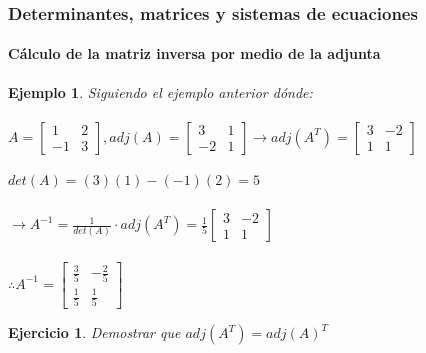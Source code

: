 \documentclass[11pt]{beamer}
\newtheorem{eje}{Ejercicio}
\newtheorem{ejem}{Ejemplo}
\begin{document}
\begin{frame}
\frametitle{Determinantes, matrices y sistemas de ecuaciones}
\framesubtitle{Cálculo de la matriz inversa por medio de la adjunta}
\begin{ejem}
Siguiendo el ejemplo anterior dónde: \\ \hspace{0cm} \\
${\displaystyle A = {\begin{bmatrix}1&2\\-1&3\end{bmatrix}}}, 
{\displaystyle adj(A) = {\begin{bmatrix}3&1\\-2&1\end{bmatrix}}} \rightarrow 
{\displaystyle adj(A^T) = {\begin{bmatrix}3&-2\\1&1\end{bmatrix}}}$\\ \hspace{0cm} \\
$det(A) = (3)(1)-(-1)(2) = 5$\\ \hspace{0cm} \\
$\rightarrow A^{-1} = \frac{1}{det(A)}\cdot adj(A^T) 
= \frac{1}{5} {\displaystyle {\begin{bmatrix}3&-2\\1&1\end{bmatrix}}}$\\ \hspace{0cm} \\
$\therefore \displaystyle A^{-1} = {\begin{bmatrix}\frac{3}{5}&-\frac{2}{5}\\\frac{1}{5}&\frac{1}{5}\end{bmatrix}}$
\end{ejem}
\begin{eje}
Demostrar que $adj(A^T) = adj(A)^T$
\end{eje}
\end{frame}
\end{document}

